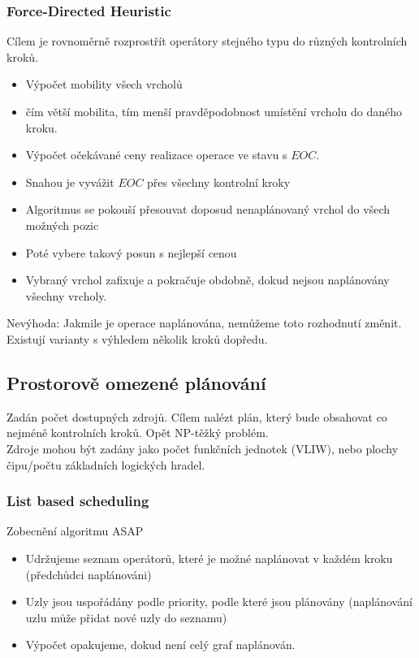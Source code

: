 \documentclass[a4paper, 11pt]{report}
\begin{document}
\subsubsection{Force-Directed Heuristic}
Cílem je rovnoměrně rozprostřít operátory stejného typu do různých kontrolních kroků.
\begin{itemize}
	\item Výpočet mobility všech vrcholů
	\item čím větší mobilita, tím menší pravděpodobnost umístění vrcholu do daného kroku.
	\item Výpočet očekávané ceny realizace operace ve stavu s $EOC$.
	\item Snahou je vyvážit $EOC$ přes všechny kontrolní kroky
	\item Algoritmus se pokouší přesouvat doposud nenaplánovaný vrchol do všech možných pozic
	\item Poté vybere takový posun s nejlepší cenou
	\item Vybraný vrchol zafixuje a pokračuje obdobně, dokud nejsou naplánovány všechny vrcholy.
\end{itemize}
Nevýhoda: Jakmile je operace naplánována, nemůžeme toto rozhodnutí změnit. Existují varianty s výhledem několik kroků dopředu.

\subsection{Prostorově omezené plánování}
Zadán počet dostupných zdrojů. Cílem nalézt plán, který bude obsahovat co nejméně kontrolních kroků.
Opět NP-těžký problém.\\
Zdroje mohou být zadány jako počet funkčních jednotek (VLIW), nebo plochy čipu/počtu základních logických hradel.

\subsubsection{List based scheduling}
Zobecnění algoritmu ASAP
\begin{itemize}
	\item Udržujeme seznam operátorů, které je možné naplánovat v každém kroku (předchůdci naplánováni)
	\item Uzly jsou uspořádány podle priority, podle které jsou plánovány (naplánování uzlu může přidat nové uzly do seznamu)
	\item Výpočet opakujeme, dokud není celý graf naplánován.
\end{itemize}
\end{document}
